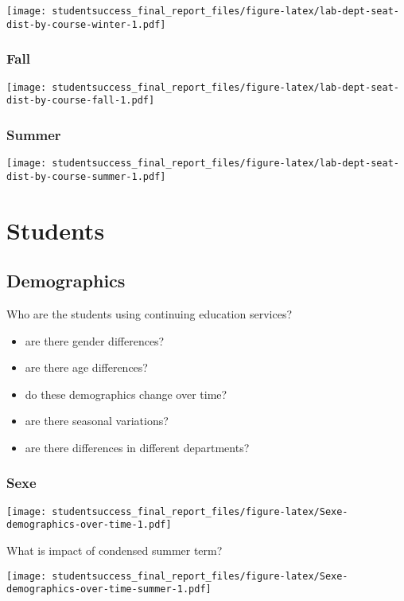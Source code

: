 \documentclass[]{book}
\providecommand{\tightlist}{%
  \setlength{\itemsep}{0pt}\setlength{\parskip}{0pt}}
\theoremstyle{definition}
\theoremstyle{definition}
\theoremstyle{remark}
\begin{document}
\texttt{[image: studentsuccess\_final\_report\_files/figure-latex/lab-dept-seat-dist-by-course-winter-1.pdf]}

\subsubsection{Fall}\label{fall}

\texttt{[image: studentsuccess\_final\_report\_files/figure-latex/lab-dept-seat-dist-by-course-fall-1.pdf]}

\subsubsection{Summer}\label{summer}

\texttt{[image: studentsuccess\_final\_report\_files/figure-latex/lab-dept-seat-dist-by-course-summer-1.pdf]}

\section{Students}\label{students}

\subsection{Demographics}\label{demographics}

Who are the students using continuing education services?

\begin{itemize}
\tightlist
\item
  are there gender differences?
\item
  are there age differences?
\item
  do these demographics change over time?
\item
  are there seasonal variations?
\item
  are there differences in different departments?
\end{itemize}

\subsubsection{Sexe}\label{sexe}

\texttt{[image: studentsuccess\_final\_report\_files/figure-latex/Sexe-demographics-over-time-1.pdf]}

What is impact of condensed summer term?

\texttt{[image: studentsuccess\_final\_report\_files/figure-latex/Sexe-demographics-over-time-summer-1.pdf]}
\end{document}
